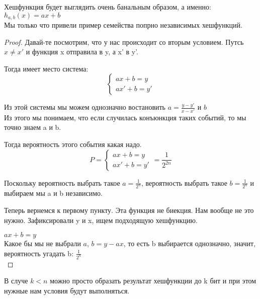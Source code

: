 \begin{theorem}
	Хешфункция будет выглядить очень банальным образом, а именно:
	$h_{a, b}(x) = ax + b$\\

	Мы только что привели пример семейства попрно независимых хешфункций.
\end{theorem}
\begin{proof}
	Давай-те посмотрим, что у нас происходит со вторым условием. 
	Путсь $x \ne x'$ и функция x отправила в y, а x' в y'.
	
	Тогда имеет место система:
	$$\left\{
	\begin{aligned}
	ax + b = y \\
	ax' + b = y'
	\end{aligned}
	\right.
	$$

	Из этой системы мы можем однозначно востановить $a = \frac{y - y'}{x - x'}$ и $b$\\
	
	Из этого мы понимаем, что если случилась конъюнкция таких событий, то мы точно знаем a и b. 

	Тогда вероятность этого события какая надо.
	$$P = \left\{
	\begin{aligned}
	ax + b = y \\
	ax' + b = y'
	\end{aligned}
	\right. = \frac{1}{2^{2n}}
	$$

	Поскольку вероятность выбрать такое $a = \frac{1}{2^n}$, вероятность выбрать такое $b = \frac{1}{2^n}$ и выбираем мы a и b независимо. 
 
	Теперь вернемся к первому пункту. Эта функция не биекция. Нам вообще не это нужно. Зафиксировали y и x, ищем 
	подходящую хешфункцию.
	
	$ax + b = y$\\

	Какое бы мы не выбрали $a$, $b = y - ax$, то есть b выбирается однозначно, 
	значит, вероятность угадать b: $\frac{1}{2^n}$\\
\end{proof} 
\begin{theorem}
	В случе $k < n$ можно просто образать результат хешфункции до k бит и при этом 
	нужные нам условия будут выполняться.
\end{theorem}
